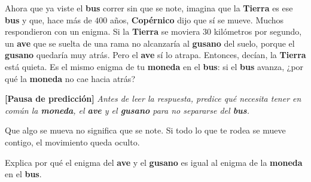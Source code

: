 \documentclass[
  spanish,
  letterpaper,
  12pt,
  oneside,
  open=any,
  DIV=15]{scrbook}
\begin{document}
Ahora que ya viste el \textcolor[HTML]{7C3AED}{\textbf{bus}} correr sin
que se note, imagina que la \textcolor[HTML]{7C3AED}{\textbf{Tierra}} es
ese \textbf{bus} y que, hace más de \(400\) años, \textbf{Copérnico}
dijo que sí se mueve. Muchos respondieron con un enigma. Si la
\textbf{Tierra} se moviera \(30\) kilómetros por segundo, un
\textcolor[HTML]{2563EB}{\textbf{ave}} que se suelta de una rama no
alcanzaría al \textcolor[HTML]{2563EB}{\textbf{gusano}} del suelo,
porque el \textbf{gusano} quedaría muy atrás. Pero el \textbf{ave} sí lo
atrapa. Entonces, decían, la \textbf{Tierra} está quieta. Es el mismo
enigma de tu \textcolor[HTML]{2563EB}{\textbf{moneda}} en el
\textbf{bus}: si el \textbf{bus} avanza, ¿por qué la \textbf{moneda} no
cae hacia atrás?

\textbf{{[}Pausa de predicción{]}} \emph{Antes de leer la respuesta,
predice qué necesita tener en común la \textbf{moneda}, el \textbf{ave}
y el \textbf{gusano} para no separarse del \textbf{bus}.}

\begin{tcolorbox}[enhanced jigsaw, arc=.35mm, bottomrule=.15mm, bottomtitle=1mm, breakable, colback=white, colbacktitle=quarto-callout-important-color!10!white, colframe=quarto-callout-important-color-frame, coltitle=black, left=2mm, leftrule=.75mm, opacityback=0, opacitybacktitle=0.6, rightrule=.15mm, title=\textcolor{quarto-callout-important-color}{\faExclamation}\hspace{0.5em}{Regla de Oro (Concepto Clave)}, titlerule=0mm, toprule=.15mm, toptitle=1mm]

Que algo se mueva no significa que se note. Si todo lo que te rodea se
mueve contigo, el movimiento queda oculto.

\end{tcolorbox}

\begin{tcolorbox}[enhanced jigsaw, arc=.35mm, bottomrule=.15mm, bottomtitle=1mm, breakable, colback=white, colbacktitle=quarto-callout-warning-color!10!white, colframe=quarto-callout-warning-color-frame, coltitle=black, left=2mm, leftrule=.75mm, opacityback=0, opacitybacktitle=0.6, rightrule=.15mm, title=\textcolor{quarto-callout-warning-color}{\faExclamationTriangle}\hspace{0.5em}{Pregunta de comprensión}, titlerule=0mm, toprule=.15mm, toptitle=1mm]

Explica por qué el enigma del \textbf{ave} y el \textbf{gusano} es igual
al enigma de la \textbf{moneda} en el \textbf{bus}.

\end{tcolorbox}
\end{document}
